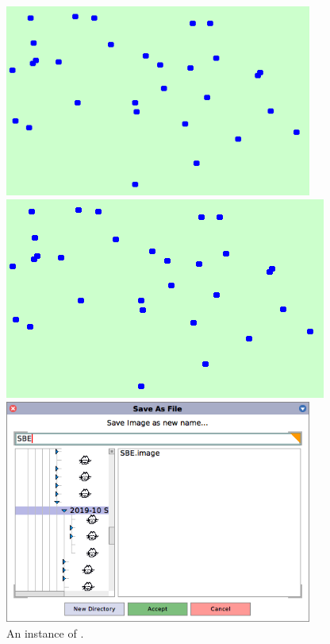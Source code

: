 \documentclass[a4paper,10pt,twoside]{book}
\begin{document}
\begin{figure}[htb]
\begin{minipage}[b]{.48\textwidth}
\ifluluelse
	{\centerline {\includegraphics[width=0.9\textwidth]{BouncingAtoms}}}
	{\centerline {\includegraphics[scale=0.7]{BouncingAtoms}}}
	\caption{An instance of .
	\label{fig:bouncingAtoms}}
\end{minipage}
\hfill
\begin{minipage}[b]{.48\textwidth}
\ifluluelse
	{\centerline{\includegraphics[width=0.9\textwidth]{saveAs}}}

\end{minipage}
\end{figure}
\end{document}
